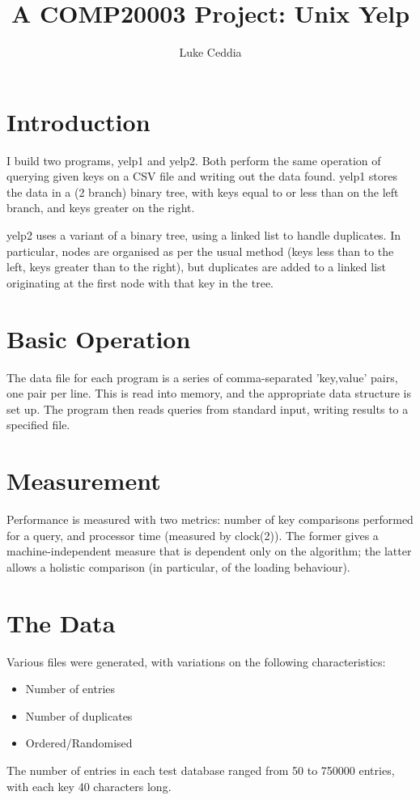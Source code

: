 \documentclass[australian,english]{article}
\begin{document}
\title{A COMP20003 Project: Unix Yelp}

\author{Luke Ceddia}
\maketitle

\section*{Introduction}

I build two programs, yelp1 and yelp2. Both perform the same operation
of querying given keys on a \foreignlanguage{australian}{CSV} file
and writing out the data found. yelp1 stores the data in a (2 branch)
binary tree, with keys equal to or less than on the left branch, and
keys greater on the right.

yelp2 uses a variant of a binary tree, using a linked list to handle
duplicates. In particular, nodes are \foreignlanguage{australian}{organised}
as per the usual method (keys less than to the left, keys greater
than to the right), but duplicates are added to a linked list originating
at the first node with that key in the tree.

\section*{Basic Operation}

The data file for each program is a series of comma-separated 'key,value'
pairs, one pair per line. This is read into memory, and the appropriate
data structure is set up. The program then reads queries from standard
input, writing results to a specified file.

\section*{Measurement}

Performance is measured with two metrics: number of key comparisons
performed for a query, and processor time (measured by clock(2)).
The former gives a machine-independent measure that is dependent only
on the algorithm; the latter allows a holistic comparison (in particular,
of the loading behaviour).

\section*{The Data}

Various files were generated, with variations on the following characteristics:
\begin{itemize}
\item Number of entries
\item Number of duplicates
\item Ordered/Randomised
\end{itemize}
The number of entries in each test database ranged from 50 to 750000
entries, with each key 40 characters long.
\end{document}
